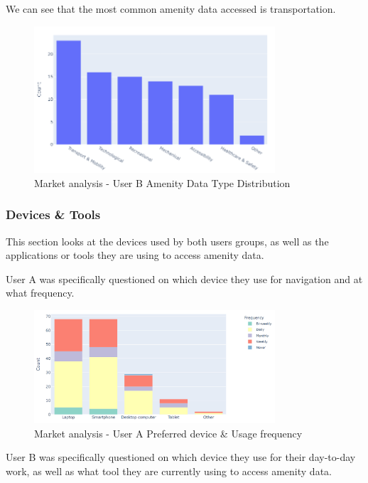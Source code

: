 We can see that the most common amenity data accessed is transportation.

\begin{figure}[htbp]
    \centering{}{}
    \includegraphics[width=0.8\textwidth]{images/mr-userb-amenity.png}
    \caption{Market analysis - User B Amenity Data Type Distribution}
\end{figure}

\subsubsection{Devices \& Tools}
This section looks at the devices used by both users groups, as well as the
applications or tools they are using to access amenity data.

User A was specifically questioned on which device they use for navigation and
at what frequency.

\begin{figure}[htbp]
    \centering{}{}
    \includegraphics[width=0.8\textwidth]{images/mr-usera-device-freq.png}
    \caption{Market analysis - User A Preferred device \& Usage frequency}
\end{figure}

User B was specifically questioned on which device they use for their day-to-day
work, as well as what tool they are currently using to access amenity data.

